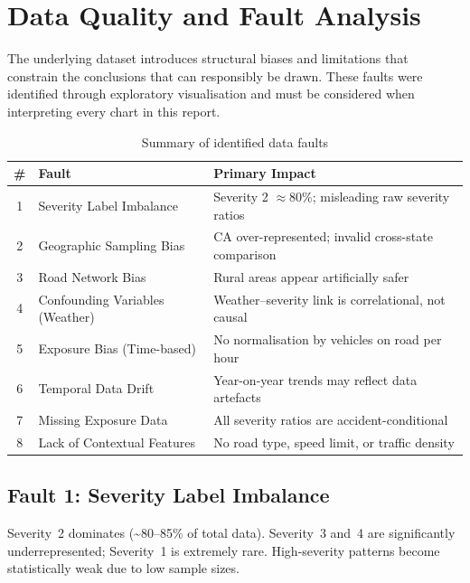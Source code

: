 
\section{Data Quality and Fault Analysis}

The underlying dataset introduces structural biases and limitations that
constrain the conclusions that can responsibly be drawn.
These faults were identified through exploratory visualisation and must be
considered when interpreting every chart in this report.

\begin{table}[H]
\centering\small
\begin{tabular}{@{} c p{4.8cm} p{7.5cm} @{}}
  \toprule
  \textbf{\#} & \textbf{Fault} & \textbf{Primary Impact} \\ \midrule
  1  & Severity Label Imbalance        & Severity 2 $\approx$80\%; misleading raw severity ratios \\
  2  & Geographic Sampling Bias        & CA over-represented; invalid cross-state comparison \\
  3  & Road Network Bias               & Rural areas appear artificially safer \\
  4  & Confounding Variables (Weather) & Weather–severity link is correlational, not causal \\
  5  & Exposure Bias (Time-based)      & No normalisation by vehicles on road per hour \\
  6  & Temporal Data Drift             & Year-on-year trends may reflect data artefacts \\
  7 & Missing Exposure Data           & All severity ratios are accident-conditional \\
  8 & Lack of Contextual Features     & No road type, speed limit, or traffic density \\
  \bottomrule
\end{tabular}
\caption{Summary of identified data faults}
\end{table}

\subsection{Fault 1: Severity Label Imbalance}
Severity~2 dominates (\textasciitilde80--85\% of total data).
Severity~3 and~4 are significantly underrepresented; Severity~1 is extremely
rare. High-severity patterns become statistically weak due to low sample sizes.

